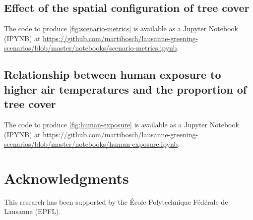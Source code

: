 \documentclass[10pt,letterpaper]{article}
\begin{document}
\subsection*{Effect of the spatial configuration of tree cover}
\label{sec:effect-config}

The code to produce \autoref{fig:scenario-metrics} is available as a Jupyter Notebook (IPYNB) at \url{https://github.com/martibosch/lausanne-greening-scenarios/blob/master/notebooks/scenario-metrics.ipynb}.


\subsection*{Relationship between human exposure to higher air temperatures and the proportion of tree cover}
\label{sec:human-exposure}


The code to produce \autoref{fig:human-exposure} is available as a Jupyter Notebook (IPYNB) at \url{https://github.com/martibosch/lausanne-greening-scenarios/blob/master/notebooks/human-exposure.ipynb}.

\section*{Acknowledgments}
This research has been supported by the \'Ecole Polytechnique F\'ed\'erale de Lausanne (EPFL).

\nolinenumbers




\end{document}
